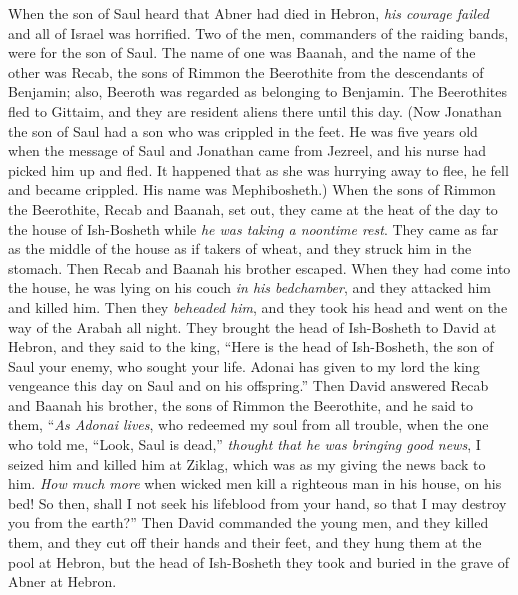 \begin{biblechapter} %
 When the son of Saul heard that Abner had died in Hebron, \textit{his courage failed} and all of Israel was horrified.
\verse Two of the men, commanders of the raiding bands, were for the son of Saul. The name of one was Baanah, and the name of the other was Recab, the sons of Rimmon the Beerothite from the descendants of Benjamin; also, Beeroth was regarded as belonging to Benjamin.
\verse The Beerothites fled to Gittaim, and they are resident aliens there until this day.
\verse (Now Jonathan the son of Saul had a son who was crippled in the feet. He was five years old when the message of Saul and Jonathan came from Jezreel, and his nurse had picked him up and fled. It happened that as she was hurrying away to flee, he fell and became crippled. His name was Mephibosheth.)
\verse When the sons of Rimmon the Beerothite, Recab and Baanah, set out, they came at the heat of the day to the house of Ish-Bosheth while \textit{he was taking a noontime rest}.
\verse They came as far as the middle of the house as if takers of wheat, and they struck him in the stomach. Then Recab and Baanah his brother escaped.
\verse When they had come into the house, he was lying on his couch \textit{in his bedchamber}, and they attacked him and killed him. Then they \textit{beheaded him}, and they took his head and went on the way of the Arabah all night.
\verse They brought the head of Ish-Bosheth to David at Hebron, and they said to the king, “Here is the head of Ish-Bosheth, the son of Saul your enemy, who sought your life. Adonai has given to my lord the king vengeance this day on Saul and on his offspring.”
\verse Then David answered Recab and Baanah his brother, the sons of Rimmon the Beerothite, and he said to them, “\textit{As Adonai lives}, who redeemed my soul from all trouble,
\verse when the one who told me, “Look, Saul is dead,” \textit{thought that he was bringing good news}, I seized him and killed him at Ziklag, which was as my giving the news back to him.
\verse \textit{How much more} when wicked men kill a righteous man in his house, on his bed! So then, shall I not seek his lifeblood from your hand, so that I may destroy you from the earth?”
\verse Then David commanded the young men, and they killed them, and they cut off their hands and their feet, and they hung them at the pool at Hebron, but the head of Ish-Bosheth they took and buried in the grave of Abner at Hebron.
\end{biblechapter}

